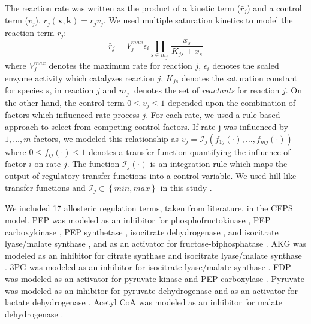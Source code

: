 \documentclass[12pt]{article}
\begin{document}
The reaction rate was written as the product of a kinetic term ($\bar{r}_{j}$) and a control term ($v_{j}$), $r_{j}\left(\mathbf{x},\mathbf{k}\right)=\bar{r}_{j}v_{j}$.
We used multiple saturation kinetics to model the reaction term $\bar{r}_{j}$:
\begin{equation}\label{eqn:rate-bar}
	\bar{r}_{j}=V_{j}^{max}\epsilon_{i}\prod_{s\in{m_{j}^{-}}}\frac{x_{s}}{K_{js} + x_{s}}
\end{equation}
where $V_{j}^{max}$ denotes the maximum rate for reaction $j$, $\epsilon_{i}$ denotes the scaled enzyme activity which catalyzes reaction $j$, $K_{js}$ denotes the saturation constant for species $s$, in reaction $j$ and $m_{j}^{-}$ denotes the set of \textit{reactants} for reaction $j$.
On the other hand, the control term $0\leq v_{j}\leq 1$ depended upon the combination of factors which influenced rate process $j$.
For each rate, we used a rule-based approach to select from competing control factors.
If rate j was influenced by $1,\dots,m$ factors, we modeled this relationship as
$v_{j}=\mathcal{I}_{j}\left(f_{1j}\left(\cdot\right),\hdots,f_{mj}\left(\cdot\right)\right)$
where $0\leq f_{ij}\left(\cdot\right)\leq 1$ denotes a transfer function quantifying the influence of factor $i$ on rate $j$.
The function $\mathcal{I}_{j}\left(\cdot\right)$ is an integration rule which maps the output of regulatory transfer functions into a control
variable. We used hill-like transfer functions and $\mathcal{I}_{j}\in\left\{min,max\right\}$ in this study \cite{pr3010138}.

We included 17 allosteric regulation terms, taken from literature, in the CFPS model.
PEP was modeled as an inhibitor for phosphofructokinase \cite{2010_kotte_MolSystBiol,2011_cabrera_JBiolChem}, PEP carboxykinase \cite{2010_kotte_MolSystBiol}, PEP synthetase \cite{2010_kotte_MolSystBiol,1973_chulavatnatol_JBiolChem}, isocitrate dehydrogenase \cite{2010_kotte_MolSystBiol,2007_ogawa_JBacteriol}, and isocitrate lyase\slash malate synthase \cite{2010_kotte_MolSystBiol,2007_ogawa_JBacteriol,1988_mackintosh_BiochemJ}, and as an activator for fructose-biphosphatase \cite{2010_kotte_MolSystBiol,2000_donahue_JBacteriol,2006_hines_JBiolChem,2007_hines_JBiolChem}.
AKG was modeled as an inhibitor for citrate synthase \cite{2010_kotte_MolSystBiol,1994_pereira_JBiolChem,1983_robinson_FEBSLett} and isocitrate lyase\slash malate synthase \cite{2010_kotte_MolSystBiol,1988_mackintosh_BiochemJ}.
3PG was modeled as an inhibitor for isocitrate lyase\slash malate synthase \cite{2010_kotte_MolSystBiol,1988_mackintosh_BiochemJ}.
FDP was modeled as an activator for pyruvate kinase \cite{2010_kotte_MolSystBiol,2010_zhu_Biochimie} and PEP carboxylase \cite{2010_kotte_MolSystBiol,1972_wohl_JBiolChem}.
Pyruvate was modeled as an inhibitor for pyruvate dehydrogenase \cite{2010_kotte_MolSystBiol,2007_kale_JBiolChem,2002_arjunan_Biochemistry} and as an activator for lactate dehydrogenase \cite{2008_okino_ApplMicrobiolBiotechnol}.
Acetyl CoA was modeled as an inhibitor for malate dehydrogenase \cite{2010_kotte_MolSystBiol}.
\end{document}
